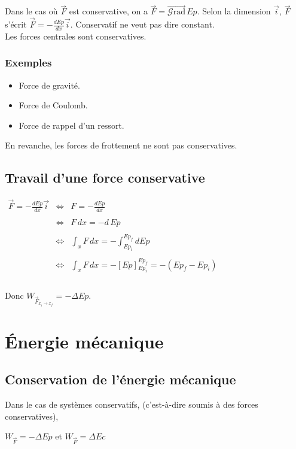 \documentclass[a4paper,10pt]{book}
\begin{document}
Dans le cas où $\vec{F}$ est conservative, on a $\vec{F}=\overrightarrow{\mathcal{G}\text{rad}}\, Ep$. Selon la dimension $\vec{i}$, $\vec{F}$ s'écrit $\vec{F}=-\frac{dEp}{dx}\vec{i}$. Conservatif ne veut pas dire constant.\\

Les forces centrales sont conservatives.

\subsubsection{Exemples}
\begin{itemize}\renewcommand{\labelitemi}{$\bullet$}
\item Force de gravité.
\item Force de Coulomb.
\item Force de rappel d'un ressort.\\
\end{itemize}

En revanche, les forces de frottement ne sont pas conservatives.

\subsection{Travail d'une force conservative}
$\begin{array}{rcl} \vec{F}=-\frac{dEp}{dx}\vec{i} &\Leftrightarrow & F=-\frac{dEp}{dx}\\\\
&\Leftrightarrow &F\, dx=-d\, Ep\\\\
&\Leftrightarrow &\displaystyle \int_{x} F\, dx=-\int_{Ep_{i}}^{Ep_{f}}dEp\\\\
&\Leftrightarrow &\displaystyle \int_{x} F\, dx=- \left[ Ep \right] {}_{Ep_{i}}^{Ep_{f}}=-(Ep_{f}-Ep_{i})\\\\ \end{array}$

Donc $W_{\vec{F}_{x_{i}\rightarrow x_{f}}}=-\Delta Ep$.

\section{Énergie mécanique}
\subsection{Conservation de l'énergie mécanique}
Dans le cas de systèmes conservatifs, (c'est-à-dire soumis à des forces conservatives),
\begin{center} $W_{\vec{F}}=-\Delta Ep$ et $W_{\vec{F}}=\Delta Ec$ \end{center}
\end{document}
